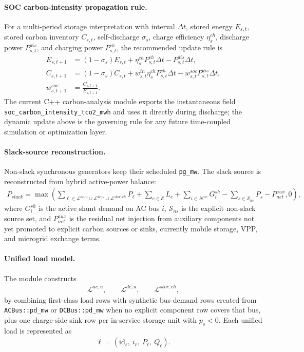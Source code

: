 \paragraph{SOC carbon-intensity propagation rule.}
For a multi-period storage interpretation with interval \(\Delta t\), stored
energy \(E_{s,t}\), stored carbon inventory \(C_{s,t}\), self-discharge
\(\sigma_s\), charge efficiency \(\eta_s^{ch}\), discharge power
\(P_{s,t}^{dis}\), and charging power \(P_{s,t}^{ch}\), the recommended update
rule is
\begin{align}
E_{s,t+1} &= (1-\sigma_s) E_{s,t}
          + \eta_s^{ch} P_{s,t}^{ch}\Delta t
          - P_{s,t}^{dis}\Delta t, \\
C_{s,t+1} &= (1-\sigma_s) C_{s,t}
          + w_{s,t}^{in}\eta_s^{ch} P_{s,t}^{ch}\Delta t
          - w_{s,t}^{soc} P_{s,t}^{dis}\Delta t, \\
w_{s,t+1}^{soc} &= \frac{C_{s,t+1}}{E_{s,t+1}}.
\end{align}
The current C++ carbon-analysis module exports the instantaneous field
\texttt{soc\_carbon\_intensity\_tco2\_mwh} and uses it directly during discharge;
the dynamic update above is the governing rule for any future time-coupled
simulation or optimization layer.

\paragraph{Slack-source reconstruction.}
Non-slack synchronous generators keep their scheduled \texttt{pg\_mw}.  The
slack source is reconstructed from hybrid active-power balance:
\begin{align}
P_{slack} = \max\!\left(
\sum_{\ell \in \mathcal{L}^{ac,u} \cup \mathcal{L}^{dc,u} \cup \mathcal{L}^{stor,ch}} P_{\ell}
+ \sum_{e \in \mathcal{E}} L_e
+ \sum_{i \in \mathcal{N}^{ac}} G_i^{sh}
- \sum_{s \in \mathcal{S}_{ns}} P_s
- P^{aux}_{net},
0\right),
\end{align}
where \(G_i^{sh}\) is the active shunt demand on AC bus \(i\),
\(\mathcal{S}_{ns}\) is the explicit non-slack source set, and
\(P^{aux}_{net}\) is the residual net injection from auxiliary components not
yet promoted to explicit carbon sources or sinks, currently mobile storage, VPP,
and microgrid exchange terms.

\paragraph{Unified load model.}
The module constructs
\begin{align}
\mathcal{L}^{ac,u},\qquad \mathcal{L}^{dc,u},\qquad \mathcal{L}^{stor,ch},
\end{align}
by combining first-class load rows with synthetic bus-demand rows created from
\texttt{ACBus::pd\_mw} or \texttt{DCBus::pd\_mw} when no explicit component row
covers that bus, plus one charge-side sink row per in-service storage unit with
\(p_s<0\).  Each unified load is represented as
\begin{align}
\ell = \left(\mathrm{id}_{\ell},\ i_{\ell},\ P_{\ell},\ Q_{\ell}\right).
\end{align}

